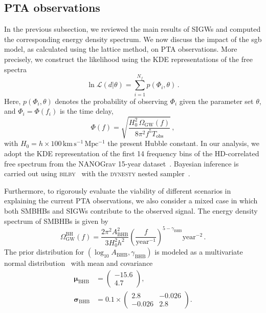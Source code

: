 \documentclass[reprint, 10pt, amsmath, amssymb, floatfix, aps, prd, superscriptaddress, nofootinbib, nobibnotes,twocolumn]{revtex4-1}
\begin{document}
\subsection{\ac{PTA} observations}
In the previous subsection, we reviewed the main results of \acp{SIGW} and computed the corresponding energy density spectrum. We now discuss the impact of the \ac{sgb} model, as calculated using the lattice method, on \ac{PTA} observations. More precisely, we construct the likelihood using the \ac{KDE} representations of the free spectra~\cite{Mitridate:2023oar,Lamb:2023jls}
\begin{equation}
    \ln \mathcal{L}(d|\theta)=\sum_{i=1}^{N_f} p(\Phi_i,\theta)\, .
\end{equation}
Here, $p(\Phi_i,\theta)$ denotes the probability of observing $\Phi_i$ given the parameter set $\theta$, and $\Phi_i=\Phi(f_i)$ is the time delay,
\begin{equation}
\Phi(f)=\sqrt{\frac{H_0^2\,\Omega_{\mathrm{GW}}(f)}{8\pi^2 f^5 T_{\mathrm{obs}}}}\, ,
\end{equation}
with $H_0=h\times100\,\mathrm{km\,s^{-1}\,Mpc^{-1}}$ the present Hubble constant. In our analysis, we adopt the \ac{KDE} representation of the first 14 frequency bins of the HD-correlated free spectrum from the NANOGrav 15-year dataset~\cite{Nanograv:KDE}. Bayesian inference is carried out using \textsc{bilby}~\cite{bilby_paper} with the \textsc{dynesty} nested sampler~\cite{Speagle:2019ivv,dynesty_software}.

Furthermore, to rigorously evaluate the viability of different scenarios in explaining the current \ac{PTA} observations, we also consider a mixed case in which both \acp{SMBHB} and \acp{SIGW} contribute to the observed signal. The energy density spectrum of \acp{SMBHB} is given by~\cite{Mitridate:2023oar,NANOGrav:2023hvm}
\begin{equation}
    \Omega_{\mathrm{GW}}^{\mathrm{BH}}(f)
    = \frac{2\pi^2 A_{\mathrm{BHB}}^2}{3H_0^2 h^2}
      \left(\frac{f}{\mathrm{year}^{-1}}\right)^{5-\gamma_{\mathrm{BHB}}}
      \mathrm{year}^{-2}\, .
\end{equation}
The prior distribution for $(\log_{10}A_{\mathrm{BHB}},\gamma_{\mathrm{BHB}})$ is modeled as a multivariate normal distribution~\cite{NANOGrav:2023hvm} with mean and covariance
\begin{equation}
\begin{aligned}
    \boldsymbol{\mu}_{\mathrm{BHB}} &= 
    \begin{pmatrix} -15.6 \\ 4.7 \end{pmatrix}, \\
    \boldsymbol{\sigma}_{\mathrm{BHB}} &= 
    0.1 \times
    \begin{pmatrix}
        2.8 & -0.026 \\
        -0.026 & 2.8
    \end{pmatrix}.
\end{aligned}
\end{equation}
\end{document}
